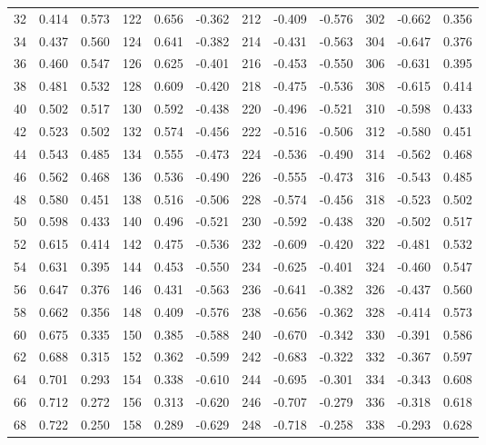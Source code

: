 \begin{table}
{\begin{tabular}{rrr|rrr|rrr|rrr}
 32 &   0.414 &  0.573 & 122 &   0.656 & -0.362 & 212 &  -0.409 & -0.576 & 302 &  -0.662 &  0.356\\
 34 &   0.437 &  0.560 & 124 &   0.641 & -0.382 & 214 &  -0.431 & -0.563 & 304 &  -0.647 &  0.376\\
 36 &   0.460 &  0.547 & 126 &   0.625 & -0.401 & 216 &  -0.453 & -0.550 & 306 &  -0.631 &  0.395\\
 38 &   0.481 &  0.532 & 128 &   0.609 & -0.420 & 218 &  -0.475 & -0.536 & 308 &  -0.615 &  0.414\\
 40 &   0.502 &  0.517 & 130 &   0.592 & -0.438 & 220 &  -0.496 & -0.521 & 310 &  -0.598 &  0.433\\
 42 &   0.523 &  0.502 & 132 &   0.574 & -0.456 & 222 &  -0.516 & -0.506 & 312 &  -0.580 &  0.451\\
 44 &   0.543 &  0.485 & 134 &   0.555 & -0.473 & 224 &  -0.536 & -0.490 & 314 &  -0.562 &  0.468\\
 46 &   0.562 &  0.468 & 136 &   0.536 & -0.490 & 226 &  -0.555 & -0.473 & 316 &  -0.543 &  0.485\\
 48 &   0.580 &  0.451 & 138 &   0.516 & -0.506 & 228 &  -0.574 & -0.456 & 318 &  -0.523 &  0.502\\
 50 &   0.598 &  0.433 & 140 &   0.496 & -0.521 & 230 &  -0.592 & -0.438 & 320 &  -0.502 &  0.517\\
 52 &   0.615 &  0.414 & 142 &   0.475 & -0.536 & 232 &  -0.609 & -0.420 & 322 &  -0.481 &  0.532\\
 54 &   0.631 &  0.395 & 144 &   0.453 & -0.550 & 234 &  -0.625 & -0.401 & 324 &  -0.460 &  0.547\\
 56 &   0.647 &  0.376 & 146 &   0.431 & -0.563 & 236 &  -0.641 & -0.382 & 326 &  -0.437 &  0.560\\
 58 &   0.662 &  0.356 & 148 &   0.409 & -0.576 & 238 &  -0.656 & -0.362 & 328 &  -0.414 &  0.573\\
 60 &   0.675 &  0.335 & 150 &   0.385 & -0.588 & 240 &  -0.670 & -0.342 & 330 &  -0.391 &  0.586\\
 62 &   0.688 &  0.315 & 152 &   0.362 & -0.599 & 242 &  -0.683 & -0.322 & 332 &  -0.367 &  0.597\\
 64 &   0.701 &  0.293 & 154 &   0.338 & -0.610 & 244 &  -0.695 & -0.301 & 334 &  -0.343 &  0.608\\
 66 &   0.712 &  0.272 & 156 &   0.313 & -0.620 & 246 &  -0.707 & -0.279 & 336 &  -0.318 &  0.618\\
 68 &   0.722 &  0.250 & 158 &   0.289 & -0.629 & 248 &  -0.718 & -0.258 & 338 &  -0.293 &  0.628\\

\end{tabular}}
\end{table}
